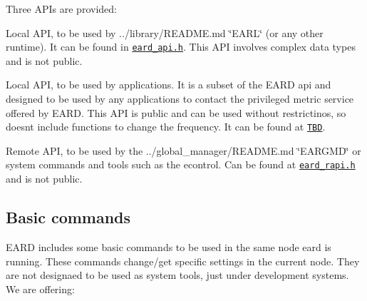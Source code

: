 Three A\+P\+Is are provided\+:
\begin{DoxyItemize}
\item Local A\+PI, to be used by ../library/\+R\+E\+A\+D\+ME.md \char`\"{}\+E\+A\+R\+L\char`\"{} (or any other runtime). It can be found in \href{eard_api.h}{\tt eard\+\_\+api.\+h}. This A\+PI involves complex data types and is not public.
\item Local A\+PI, to be used by applications. It is a subset of the E\+A\+RD api and designed to be used by any applications to contact the privileged metric service offered by E\+A\+RD. This A\+PI is public and can be used without restrictinos, so doesn\textquotesingle{}t include functions to change the frequency. It can be found at \href{.}{\tt T\+BD}.
\item Remote A\+PI, to be used by the ../global\+\_\+manager/\+R\+E\+A\+D\+ME.md \char`\"{}\+E\+A\+R\+G\+M\+D\char`\"{} or system commands and tools such as the {\ttfamily econtrol}. Can be found at \href{eard_rapi.h}{\tt eard\+\_\+rapi.\+h} and is not public.
\end{DoxyItemize}

\subsection*{Basic commands }

E\+A\+RD includes some basic commands to be used in the same node eard is running. These commands change/get specific settings in the current node. They are not designaed to be used as system tools, just under development systems. We are offering\+:


